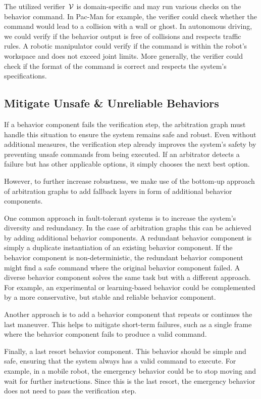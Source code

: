 The utilized verifier~$\mathcal{V}$ is domain-specific and may run various checks on the behavior command.
In Pac-Man for example, the verifier could check whether the command would lead to a collision with a wall or ghost.
In autonomous driving, we could verify if the behavior output is free of collisions and respects traffic rules.
A robotic manipulator could verify if the command is within the robot's workspace and does not exceed joint limits.
More generally, the verifier could check if the format of the command is correct and respects the system's specifications.

\subsection{Mitigate Unsafe \& Unreliable Behaviors}
If a behavior component fails the verification step, the arbitration graph must handle this situation to ensure the system remains safe and robust.
Even without additional measures, the verification step already improves the system's safety by preventing unsafe commands from being executed.
If an arbitrator detects a failure but has other applicable options, it simply chooses the next best option.

However, to further increase robustness, we make use of the bottom-up approach of arbitration graphs to add fallback layers in form of additional behavior components.

One common approach in fault-tolerant systems is to increase the system's diversity and redundancy.
In the case of arbitration graphs this can be achieved by adding additional behavior components.
A redundant behavior component is simply a duplicate instantiation of an existing behavior component.
If the behavior component is non-deterministic, the redundant behavior component might find a safe command where the original behavior component failed.
A diverse behavior component solves the same task but with a different approach.
For example, an experimental or learning-based behavior could be complemented by a more conservative, but stable and reliable behavior component.
 
Another approach is to add a behavior component that repeats or continues the last maneuver.
This helps to mitigate short-term failures, such as a single frame where the behavior component fails to produce a valid command.

Finally, a last resort behavior component.
This behavior should be simple and safe, ensuring that the system always has a valid command to execute.
For example, in a mobile robot, the emergency behavior could be to stop moving and wait for further instructions.
Since this is the last resort, the emergency behavior does not need to pass the verification step.

